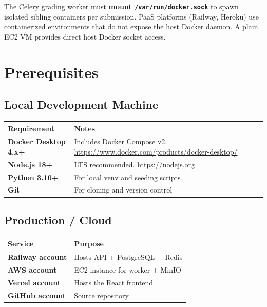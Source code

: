 \documentclass[12pt,a4paper]{article}
\begin{document}
\begin{infobox}
  The Celery grading worker must \textbf{mount \texttt{/var/run/docker.sock}} to spawn isolated sibling containers per submission. PaaS platforms (Railway, Heroku) use containerized environments that do not expose the host Docker daemon. A plain EC2 VM provides direct host Docker socket access.
\end{infobox}

\section{Prerequisites}

\subsection{Local Development Machine}

\begin{center}
\begin{tabularx}{\linewidth}{>{\bfseries}lX}
\toprule
Requirement & Notes \\
\midrule
Docker Desktop 4.x+  & Includes Docker Compose v2. \url{https://www.docker.com/products/docker-desktop/} \\
Node.js 18+          & LTS recommended. \url{https://nodejs.org} \\
Python 3.10+         & For local venv and seeding scripts \\
Git                  & For cloning and version control \\
\bottomrule
\end{tabularx}
\end{center}

\subsection{Production / Cloud}

\begin{center}
\begin{tabularx}{\linewidth}{>{\bfseries}lX}
\toprule
Service & Purpose \\
\midrule
Railway account    & Hosts API + PostgreSQL + Redis \\
AWS account        & EC2 instance for worker + MinIO \\
Vercel account     & Hosts the React frontend \\
GitHub account     & Source repository \\
\bottomrule
\end{tabularx}
\end{center}
\end{document}

